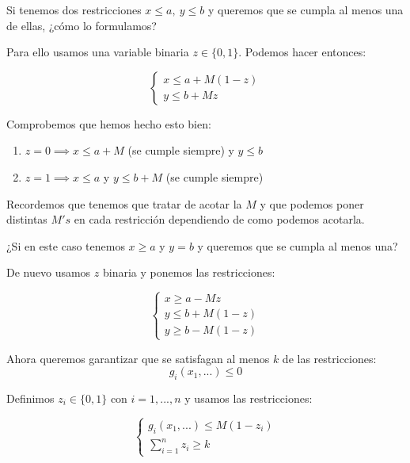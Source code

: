 \documentclass[openany]{book}
\begin{document}
\begin{exercise}
Si tenemos dos restricciones $ x\leq a,\ y\leq b $ y queremos que se cumpla al menos una de ellas, ¿cómo lo formulamos?

Para ello usamos una variable binaria $ z \in \{0,1\} $. Podemos hacer entonces:

$$ 
\left\{
\begin{array}{l}
  x\leq a +M(1-z)\\
  y\leq b+Mz
\end{array}
\right.
$$

Comprobemos que hemos hecho esto bien:

\begin{enumerate}
  \item $ z = 0 \implies x \leq a+M $ (se cumple siempre) y $ y\leq b $
  \item $ z=1 \implies x \leq a $ y $ y\leq b+M $ (se cumple siempre)
\end{enumerate}

Recordemos que tenemos que tratar de acotar la $ M $ y que podemos poner distintas $ M's $ en cada restricción dependiendo de como podemos acotarla.

\end{exercise}

\begin{exercise}
  ¿Si en este caso tenemos $ x\geq a $ y $ y = b $ y queremos que se cumpla al menos una?

  De nuevo usamos $ z  $ binaria y ponemos las restricciones:

  $$ \left\{
  \begin{array}{l}
    x \geq a-Mz\\
    y\leq b +M(1-z)\\
    y\geq b-M(1-z)
  \end{array}
  \right. $$
\end{exercise}

\begin{exercise}
  Ahora queremos garantizar que se satisfagan al menos $ k $ de las restricciones:
  $$ g_i(x_1,...) \leq 0 $$


  Definimos $ z_i \in \{0,1\} $ con $ i = 1,...,n $ y usamos las restricciones:

  $$ 
  \left\{
  \begin{array}{l}
    g_i(x_1,...) \leq M(1-z_i)\\
    \sum\limits_{i=1}^{n}z_i \geq k
  \end{array}
  \right.
  $$

\end{exercise}
\end{document}
